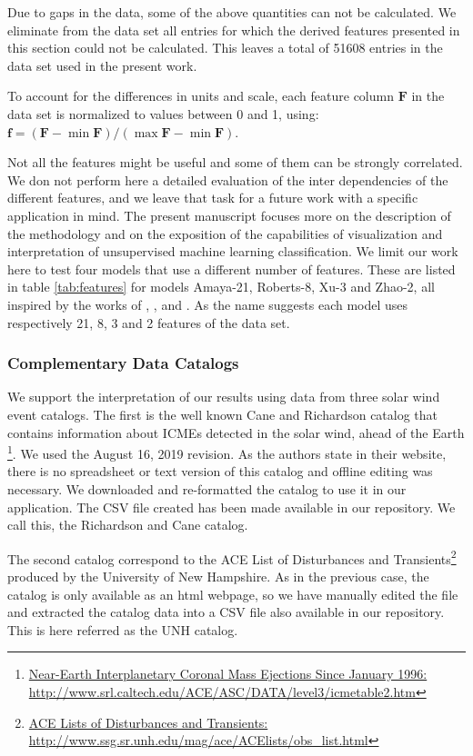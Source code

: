 Due to gaps in the data, some of the above quantities can not be calculated. We eliminate from the data set all entries for which the derived features presented in this section could not be calculated. This leaves a total of 51608 entries in the data set used in the present work.

To account for the differences in units and scale, each feature column $\boldsymbol{F}$ in the data set is normalized to values between 0 and 1, using: $\boldsymbol{f}=\left(\boldsymbol{F}-\min{\boldsymbol{F}}\right) /\left(\max{\boldsymbol{F}}-\min{\boldsymbol{F}}\right)$.

Not all the features might be useful and some of them can be strongly correlated. We don not perform here a detailed evaluation of the inter dependencies of the different features, and we leave that task for a future work with a specific application in mind. The present manuscript focuses more on the description of the methodology and on the exposition of the capabilities of visualization and interpretation of unsupervised machine learning classification. We limit our work here to test four models that use a different number of features. These are listed in table \ref{tab:features} for models Amaya-21, Roberts-8, Xu-3 and Zhao-2, all inspired by the works of \citep{Roberts2020}, \citep{Xu2015b}, and \citep{Zhao2009}. As the name suggests each model uses respectively 21, 8, 3 and 2 features of the data set.

\subsubsection{Complementary Data Catalogs}
We support the interpretation of our results using data from three solar wind event catalogs. The first is the well known Cane and Richardson catalog that contains information about ICMEs detected in the solar wind, ahead of the Earth \citep{Cane2003} \citep{Richardson2010} \footnote{\href{http://www.srl.caltech.edu/ACE/ASC/DATA/level3/icmetable2.htm}{Near-Earth Interplanetary Coronal Mass Ejections Since January 1996: http://www.srl.caltech.edu/ACE/ASC/DATA/level3/icmetable2.htm}}. We used the August 16, 2019 revision. As the authors state in their website, there is no spreadsheet or text version of this catalog and offline editing was necessary. We downloaded and re-formatted the catalog to use it in our application. The CSV file created has been made available in our repository. We call this, the Richardson and Cane catalog. 

The second catalog correspond to the ACE List of Disturbances and Transients\footnote{\href{http://www.ssg.sr.unh.edu/mag/ace/ACElists/obs\_list.html}{ACE Lists of Disturbances and Transients: http://www.ssg.sr.unh.edu/mag/ace/ACElists/obs\_list.html}} produced by the University of New Hampshire. As in the previous case, the catalog is only available as an html webpage, so we have manually edited the file and extracted the catalog data into a CSV file also available in our repository. This is here referred as the UNH catalog.

